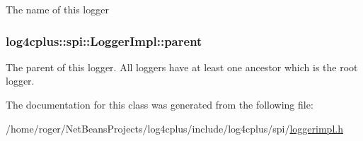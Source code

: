 The name of this logger \hypertarget{classlog4cplus_1_1spi_1_1LoggerImpl_a8a3f29bd44b2897f2f694fd8e1847d2e}{
\subsubsection[{parent}]{ log4cplus\-::spi\-::\-Logger\-Impl\-::parent\hspace{0.3cm}{\ttfamily [protected]}}}\label{classlog4cplus_1_1spi_1_1LoggerImpl_a8a3f29bd44b2897f2f694fd8e1847d2e}
The parent of this logger. All loggers have at least one ancestor which is the root logger. 

The documentation for this class was generated from the following file\-:\begin{DoxyCompactItemize}
\item 
/home/roger/\-Net\-Beans\-Projects/log4cplus/include/log4cplus/spi/\hyperlink{loggerimpl_8h}{loggerimpl.\-h}\end{DoxyCompactItemize}
